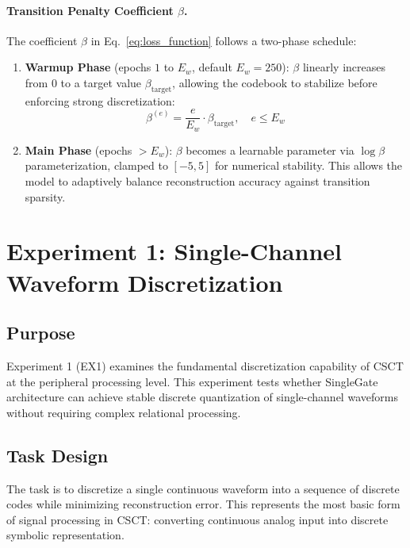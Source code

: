 \documentclass{article}
\begin{document}
\paragraph{Transition Penalty Coefficient $\beta$.}
The coefficient $\beta$ in Eq.~\eqref{eq:loss_function} follows a two-phase schedule:
\begin{enumerate}
    \item \textbf{Warmup Phase} (epochs $1$ to $E_w$, default $E_w=250$): $\beta$ linearly increases from 0 to a target value $\beta_{\text{target}}$, allowing the codebook to stabilize before enforcing strong discretization:
    \begin{equation}
        \beta^{(e)} = \frac{e}{E_w} \cdot \beta_{\text{target}}, \quad e \le E_w
    \end{equation}
    \item \textbf{Main Phase} (epochs $> E_w$): $\beta$ becomes a learnable parameter via $\log \beta$ parameterization, clamped to $[-5, 5]$ for numerical stability. This allows the model to adaptively balance reconstruction accuracy against transition sparsity.
\end{enumerate}

\clearpage

\section{Experiment 1: Single-Channel Waveform Discretization}

\subsection{Purpose}
Experiment 1 (EX1) examines the fundamental discretization capability of CSCT at the peripheral processing level. This experiment tests whether SingleGate architecture can achieve stable discrete quantization of single-channel waveforms without requiring complex relational processing.

\subsection{Task Design}
The task is to discretize a single continuous waveform into a sequence of discrete codes while minimizing reconstruction error. This represents the most basic form of signal processing in CSCT: converting continuous analog input into discrete symbolic representation.
\end{document}
